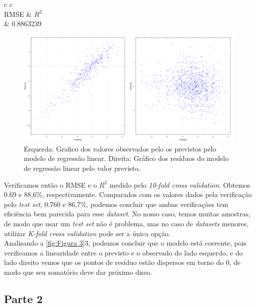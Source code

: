\documentclass[a4paper,11pt]{article}
\begin{document}
	\begin{center}
		\begin{tabular}{c c}
			\\
			\hline
			RMSE & $R^{2}$ \\
			 & 0.8863239
		\end{tabular}
	\end{center}
	\begin{figure}[h!]
		\begin{center}
			\includegraphics[scale=0.3]{fig/lmplot}
			\caption{Esquerda: Grafico dos valores observados pelo os previstos pelo modelo de regressão linear. Direita: Gráfico dos resíduos do modelo de regressão linear pelo valor previsto.}
		\end{center}
	\label{fig:Figura 3}
	\end{figure}
	Verificamos então o RMSE e o $R^{2}$ medido pelo \textit{10-fold cross validation}. Obtemos 0.69 e 88,6\%, respectivamente. Comparados com os valores dados pela verificação pelo \textit{test set}, 0.760 e 86,7\%, podemos concluir que ambas verificações tem eficiência bem parecida para esse \textit{dataset}. No nosso caso, temos muitas amostras, de modo que usar um \textit{test set} não é problema, mas no caso de \textit{datasets} menores, utilizar \textit{K-fold cross validation} pode ser a única opção.\\
	Analisando a \autoref{fig:Figura 3}3, podemos concluir que o modelo está coerente, pois verificamos a linearidade entre o previsto e o observado do lado esquerdo, e do lado direito vemos que os pontos de resíduo estão dispersos em torno do 0, de modo que seu somatório deve dar próximo disso.
	\begin{center}
		\section*{Parte 2}
	\end{center}
\end{document}
